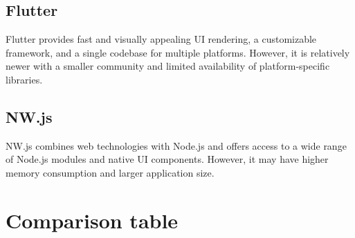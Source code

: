 \documentclass[a4paper, 11pt]{article}
\begin{document}
\subsection{Flutter}
Flutter provides fast and visually appealing UI rendering, a customizable framework, and a single codebase for multiple platforms. However, it is relatively newer with a smaller community and limited availability of platform-specific libraries.

\subsection{NW.js}
NW.js combines web technologies with Node.js and offers access to a wide range of Node.js modules and native UI components. However, it may have higher memory consumption and larger application size.

\section{Comparison table}
\end{document}

